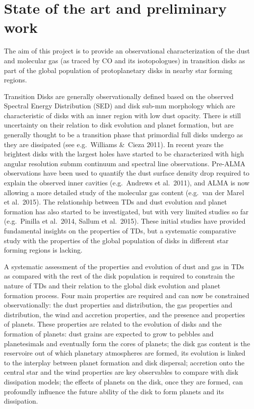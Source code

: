 \documentclass[10pt,fleqn,twoside]{article}
\begin{document}
\section{State of the art and preliminary work}
\renewcommand{\leftmark}{\sc State of the Art and preliminary work}

The aim of this project is to provide an observational characterization of the dust and molecular gas
(as traced by CO and its isotopologues) in transition disks as part of the global population of protoplanetary disks in nearby star forming regions.  

Transition Disks are generally observationally defined based on the observed Spectral Energy
Distribution (SED) and disk sub-mm morphology which are characteristic of disks with an inner region
with low dust opacity. There is still uncertainty on their relation 
to disk evolution and planet formation, but are generally thought to be a transition phase that
primordial full disks undergo as they are dissipated (see e.g.\ Williams \&\ Cieza 2011). In recent 
years the brightest disks with the largest holes have started to be characterized with high angular resolution submm continuum and spectral line observations. 
Pre-ALMA observations have been used to quantify the dust surface density drop required to 
explain the observed inner cavities (e.g.\ Andrews et al.~2011), and ALMA is now allowing a more 
detailed study of the molecular gas content (e.g.\ van der Marel et al.~2015). 
The relationship between TDs and dust evolution and planet formation has also started to be investigated,
but with very limited studies so far (e.g.\ Pinilla et al.~2014, Sallum et al.~2015).
These initial studies have provided fundamental insights on the properties of TDs, but a 
systematic comparative study with the properties of the global population of disks in different 
star forming regions is lacking.

A systematic assessment of the properties and evolution of dust and gas in TDs as compared with the rest of the disk population is required to constrain the nature of TDs and their relation to the global disk evolution and planet formation process. Four main properties are required and can now be constrained 
observationally: the dust properties and distribution, the gas properties and distribution, the wind and accretion properties, and the presence and properties of planets. These properties are related to the evolution of disks and the formation of planets: dust grains are expected to grow to pebbles and planetesimals and eventually form the cores of planets; the disk gas content is the reservoire out of which planetary atmospheres are formed, its evolution is linked to the interplay between planet formation and disk dispersal; accretion onto the central star and the wind properties are key observables to compare with disk dissipation models; the effects of planets on the disk, once they are formed, can profoundly influence the future ability of the disk to form planets and its dissipation.
\end{document}
